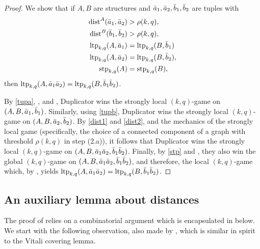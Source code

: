 \begin{proof}
    We show that 
    if $A,B$ are structures and $\bar a_1,\bar a_2,\bar b_1,\bar b_2$ are tuples with 
    \begin{align}
        \mathrm{dist}^A(\bar a_1,\bar a_2)&>\rho(k,q),\label{dist1}\\
        \mathrm{dist}^B(\bar b_1,\bar b_2)&>\rho(k,q),\label{dist2}\\
        \textnormal{ltp}_{k,q}(A,\bar a_1)&=\textnormal{ltp}_{k,q}(B,\bar b_1)\label{tupa}\\
        \textnormal{ltp}_{k,q}(A,\bar a_2)&=\textnormal{ltp}_{k,q}(B,\bar b_2)\label{tupb},\\
        \textnormal{stp}_{k,q}(A)&=\textnormal{stp}_{k,q}(B)\label{stp},
    \end{align}
    then $\textnormal{ltp}_{k,q}(A,\bar a_1\bar a_2)=\textnormal{ltp}_{k,q}(B,\bar b_1\bar b_2)$.

    By \eqref{tupa}, , and , 
    Duplicator wins the strongly local $(k,q)$-game on $(A,B,\bar a_1,\bar b_1)$.
    Similarly, using \eqref{tupb}, Duplicator wins the strongly local $(k,q)$-game on $(A,B,\bar a_2,\bar b_2)$.
    By \eqref{dist1} and \eqref{dist2},
    and the mechanics of the strongly local game (specifically, the choice of a connected component of a graph with threshold $\rho(k,q)$ in step (2.a)),
    it follows that Duplicator wins the strongly local $(k,q)$-game on $(A,B,\bar a_1\bar a_2,\bar b_1\bar b_2)$.
    Finally, by \eqref{stp} and , they also win the global \((k,q)\)-game  on $(A,B,\bar a_1\bar a_2,\bar b_1\bar b_2)$,
            and therefore, the local $(k,q)$-game 
            which, by , yields  $\textnormal{ltp}_{k,q}(A,\bar a_1\bar a_2)=\textnormal{ltp}_{k,q}(B,\bar b_1\bar b_2)$.
\end{proof}




\subsection{An auxiliary lemma about distances}
The proof of  
relies on a combinatorial argument which is encapsulated in  below.
We start with the following observation, also made by \cite[Lem. 3]{learningLogic},
which is similar in spirit to the Vitali covering lemma.

